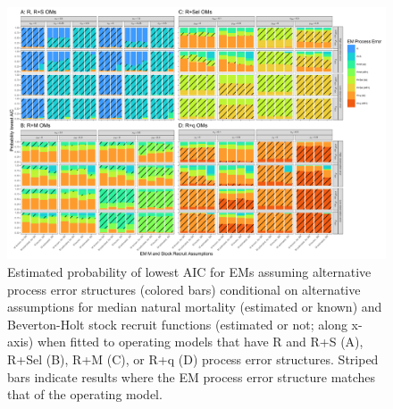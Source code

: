 \documentclass[
  12pt,
]{article}
\begin{document}
\begin{landscape}
\begin{figure}
\begin{center}
\includegraphics{pe_aic_plots}
\end{center}
\caption{Estimated probability of lowest AIC for EMs assuming alternative process error structures (colored bars) conditional on alternative assumptions for median natural mortality (estimated or known) and Beverton-Holt stock recruit functions (estimated or not; along x-axis) when fitted to operating models that have R and R+S (A), R+Sel (B), R+M (C), or R+q (D) process error structures. Striped bars indicate results where the EM process error structure matches that of the operating model.}\label{pe_aic}
\end{figure}
\end{landscape}

\clearpage
\end{document}
